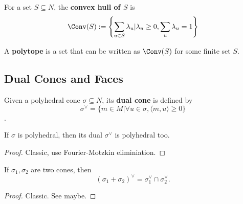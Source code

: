 \begin{definition}
  \label{1-2-2-convex-hull}
  \leanok

  For a set $S \subseteq N$, the {\bf convex hull of $S$} is
  $$\Conv(S) := \left\{\sum_{u \in S} \lambda_u | \lambda_u \ge 0, \sum_u \lambda_u = 1\right\}$$
\end{definition}


\begin{definition}[Polytope]
  \label{1-2-2-polytope}
  \leanok

  A {\bf polytope} is a set that can be written as $\Conv(S)$ for some finite set $S$.
\end{definition}


\subsection{Dual Cones and Faces}


\begin{definition}
  \label{1-2-3-dual-cone}
  \leanok

  Given a polyhedral cone $\sigma \subseteq N$, its {\bf dual cone} is defined by
  $$\sigma^\vee = \{m \in M | \forall u \in \sigma, \langle m, u\rangle \ge 0\}$$.
\end{definition}


\begin{proposition}
  \label{1-2-4-dual-polyhedral-cone}
  \leanok

  If $\sigma$ is polyhedral, then its dual $\sigma^\vee$ is polyhedral too.
\end{proposition}
\begin{proof}
  \leanok

  Classic, use Fourier-Motzkin eliminiation.
\end{proof}


\begin{proposition}
  \label{1-2-dual-cone-add}

  If $\sigma_1, \sigma_2$ are two cones, then
  $$(\sigma_1 + \sigma_2)^\vee = \sigma_1^\vee \cap \sigma_2^\vee.$$
\end{proposition}
\begin{proof}

  Classic. See \cite{Oda_1988} maybe.
\end{proof}


